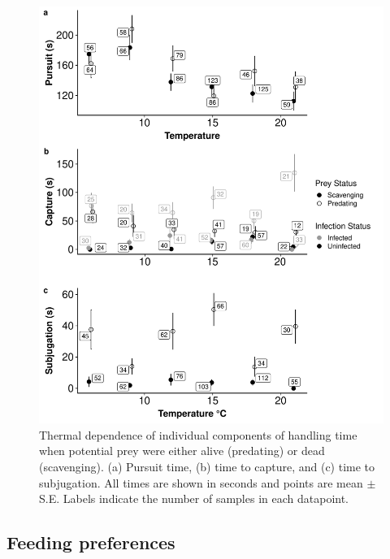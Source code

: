 \begin{figure}[H]
    \centering
    \includegraphics[keepaspectratio,width=\textwidth]{figures/ch4/time_fig_numbers.pdf}
  \caption [Thermal dependence of components of handling time when potential prey were either mobile or sessile]{Thermal dependence of individual components of handling time when potential prey were either alive (predating) or dead (scavenging). (a) Pursuit time, (b) time to capture, and (c) time to subjugation. All times are shown in seconds and points are mean  $\pm$ S.E. Labels indicate the number of samples in each datapoint.} 
    \label{fig:feedtime}
\end{figure}

\subsection{Feeding preferences}

